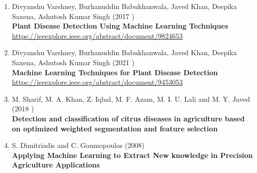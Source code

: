 \begin{enumerate}
      \item Divyanshu Varshney, Burhanuddin Babukhanwala, Javed Khan, Deepika Saxena, Ashutosh Kumar Singh (2017 ) \\
        \textbf{Plant Disease Detection Using Machine Learning Techniques} \\
        \href{https://ieeexplore.ieee.org/abstract/document/9824653}{https://ieeexplore.ieee.org/abstract/document/9824653} \\

        \item Divyanshu Varshney, Burhanuddin Babukhanwala, Javed Khan, Deepika Saxena, Ashutosh Kumar Singh (2021 ) \\
        \textbf{Machine Learning Techniques for Plant Disease Detection} \\
        \href{https://ieeexplore.ieee.org/abstract/document/9453053}{https://ieeexplore.ieee.org/abstract/document/9453053} \\

        \item M. Sharif, M. A. Khan, Z. Iqbal, M. F. Azam, M. I. U. Lali and M. Y. Javed (2018 )\\
        \textbf{Detection and classification of citrus diseases in agriculture based on optimized weighted segmentation and feature selection} \\
        
    \item S. Dimitriadis and C. Goumopoulos (2008)\\
        \textbf{Applying Machine Learning to Extract New knowledge in Precision Agriculture Applications} \\
\end{enumerate}


\par

\newpage
